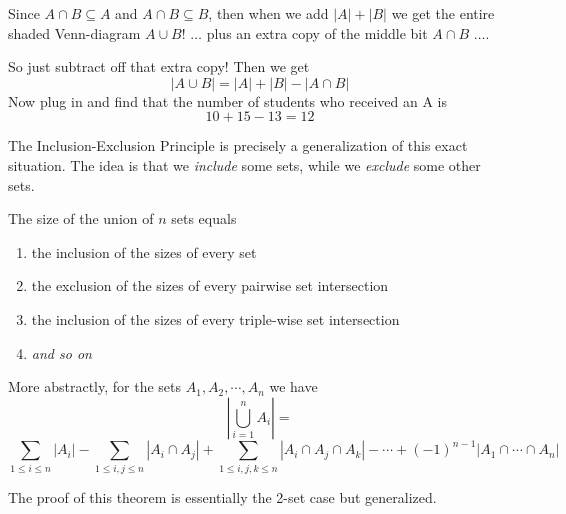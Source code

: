 \documentclass[main.tex]{subfiles}
\begin{document}
\begin{example}
	Since \(A \cap B \subseteq A\) and \(A \cap B \subseteq B\), then when we add \(|A| + |B|\) we get the entire shaded Venn-diagram \(A \cup B\)! \(\dots\) plus an extra copy of the middle bit \(A \cap B\) \(\dots\).
	
	So just subtract off that extra copy! Then we get \[|A \cup B| = |A| + |B| - |A \cap B|\]
	Now plug in and find that the number of students who received an A is \[10 + 15 - 13 = 12\]
\end{example}

The Inclusion-Exclusion Principle is precisely a generalization of this exact situation. The idea is that we \textit{include} some sets, while we \textit{exclude} some other sets.

\begin{thm}
	The size of the union of \(n\) sets equals
	\begin{enumerate}
		\item the inclusion of the sizes of every set
		\item the exclusion of the sizes of every pairwise set intersection
		\item the inclusion of the sizes of every triple-wise set intersection
		\item \textit{and so on}
	\end{enumerate}
	
	More abstractly, for the sets \(A_1,A_2,\cdots,A_n\) we have \[|\bigcup_{i=1}^{n} A_i| =\]\[\sum_{1 \leq i \leq n} |A_i| - \sum_{1 \leq i,j \leq n} |A_i \cap A_j| + \sum_{1 \leq i,j,k \leq n} |A_i \cap A_j \cap A_k| - \cdots + (-1)^{n-1}|A_1 \cap \cdots \cap A_n|\]
\end{thm}

\begin{rem}
	The proof of this theorem is essentially the 2-set case but generalized.
\end{rem}
\end{document}
